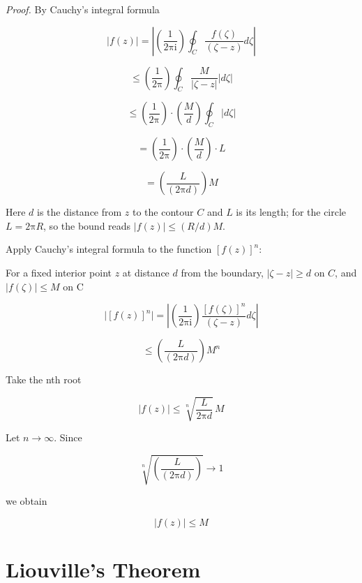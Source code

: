 \documentclass[11pt,a4paper]{article}
\theoremstyle{definition}
\theoremstyle{plain}
\begin{document}
\textit{Proof.} By Cauchy’s integral formula

\begin{equation}
\vert{}f(z)\vert{} = \left\vert{}\left(\frac{1}{2\mathrm{\pi}\mathrm{i}}\right)\oint_{C}\frac{f(\zeta)}{(\zeta - z)}d\zeta\right\vert{}
\end{equation}

\[
\le \left(\frac{1}{2\mathrm{\pi}}\right)\oint_{C}\frac{M}{\vert{}\zeta - z\vert{}}\vert{}d\zeta\vert{}
\]

\[
\le \left(\frac{1}{2\mathrm{\pi}}\right) \cdot\left(\frac{M}{d}\right)\oint_{C}\vert{}d\zeta\vert{}
\]

\[
= \left(\frac{1}{2\mathrm{\pi}}\right) \cdot\left(\frac{M}{d}\right) \cdot L
\]

\[
= \left(\frac{L}{(2\mathrm{\pi}d)}\right)M
\]

Here $d$ is the distance from $z$ to the contour $C$ and $L$ is its length; for the circle $L = 2\mathrm{\pi}R$, so the bound reads $\vert{}f(z)\vert{} \le (R/d)M$.

Apply Cauchy’s integral formula to the function $[f(z)]^{n}$:

For a fixed interior point $z$ at distance $d$ from the boundary, $\vert{}\zeta - z\vert{} \ge d$ on $C$, and $\vert{}f(\zeta)\vert{} \le M$ on C

\begin{equation}
\vert{}[f(z)]^{n}\vert{} = \left\vert{}\left(\frac{1}{2\mathrm{\pi}\mathrm{i}}\right)\frac{[f(\zeta)]^{n}}{(\zeta - z)}d\zeta\right\vert{}
\end{equation}

\[
\le \left(\frac{L}{(2\mathrm{\pi}d)}\right)M^{n}
\]

Take the nth root

\begin{equation}
\vert{}f(z)\vert{} \le \sqrt[n]{\frac{L}{2\mathrm{\pi}d}}\,M
\end{equation}

Let $n \to \infty$. Since

\begin{equation}
\sqrt[n]{\left(\frac{L}{(2\mathrm{\pi}d)}\right)} \to 1
\end{equation}

we obtain

\begin{equation}
\vert{}f(z)\vert{} \le M
\end{equation}

\section{Liouville's Theorem}
\end{document}
